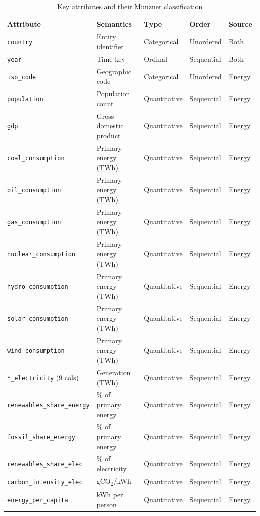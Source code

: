 \documentclass[10pt]{article}
\begin{document}
\begin{table}[h]
\caption{Key attributes and their Munzner classification}
\label{tab:attributes}
\begin{center}
\small
\begin{tabular}{lllll}
\toprule
\textbf{Attribute} & \textbf{Semantics} & \textbf{Type} & \textbf{Order} & \textbf{Source} \\
\midrule
\texttt{country} & Entity identifier & Categorical & Unordered & Both \\
\texttt{year} & Time key & Ordinal & Sequential & Both \\
\texttt{iso\_code} & Geographic code & Categorical & Unordered & Energy \\
\texttt{population} & Population count & Quantitative & Sequential & Energy \\
\texttt{gdp} & Gross domestic product & Quantitative & Sequential & Energy \\
\texttt{coal\_consumption} & Primary energy (TWh) & Quantitative & Sequential & Energy \\
\texttt{oil\_consumption} & Primary energy (TWh) & Quantitative & Sequential & Energy \\
\texttt{gas\_consumption} & Primary energy (TWh) & Quantitative & Sequential & Energy \\
\texttt{nuclear\_consumption} & Primary energy (TWh) & Quantitative & Sequential & Energy \\
\texttt{hydro\_consumption} & Primary energy (TWh) & Quantitative & Sequential & Energy \\
\texttt{solar\_consumption} & Primary energy (TWh) & Quantitative & Sequential & Energy \\
\texttt{wind\_consumption} & Primary energy (TWh) & Quantitative & Sequential & Energy \\
\texttt{*\_electricity} (9 cols) & Generation (TWh) & Quantitative & Sequential & Energy \\
\texttt{renewables\_share\_energy} & \% of primary energy & Quantitative & Sequential & Energy \\
\texttt{fossil\_share\_energy} & \% of primary energy & Quantitative & Sequential & Energy \\
\texttt{renewables\_share\_elec} & \% of electricity & Quantitative & Sequential & Energy \\
\texttt{carbon\_intensity\_elec} & gCO\textsubscript{2}/kWh & Quantitative & Sequential & Energy \\
\texttt{energy\_per\_capita} & kWh per person & Quantitative & Sequential & Energy \\

\end{tabular}
\end{center}
\end{table}
\end{document}
